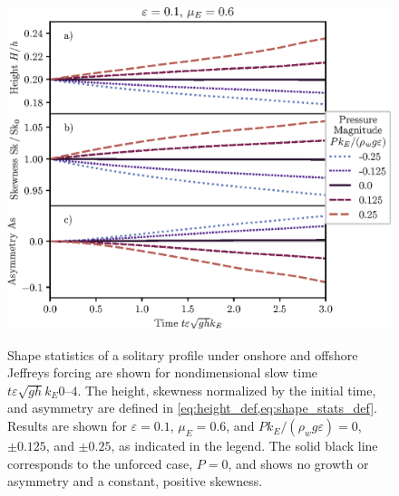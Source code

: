 \documentclass{jfm}
\renewcommand*{\epsilon}{\varepsilon}
\begin{document}
\begin{figure}
  \centering
  { %
    \label{fig:statistics_solitary:a}
    \label{fig:statistics_solitary:b}
    \label{fig:statistics_solitary:c}
  }
  \includegraphics{Skew-Asymm-No-Peak.eps}
  \caption{
    Shape statistics of a solitary profile under onshore and offshore
    Jeffreys forcing are shown for nondimensional slow time $t \epsilon
    \sqrt{gh} k_E \numrange{0}{4}$.
    The
    height,
    skewness normalized by the initial time, and
    asymmetry are defined in
    \cref{eq:height_def,eq:shape_stats_def}.
    Results are shown for $\epsilon=0.1$, $\mu_E = 0.6$, and $P
    k_E/(\rho_w g \epsilon) = 0$, $\pm 0.125$, and $\pm 0.25$, as
    indicated in the legend.
    The solid black line corresponds to the unforced case, $P = 0$, and
    shows no growth or asymmetry and a constant, positive skewness.
  }\label{fig:statistics_solitary}
\end{figure}
\end{document}
